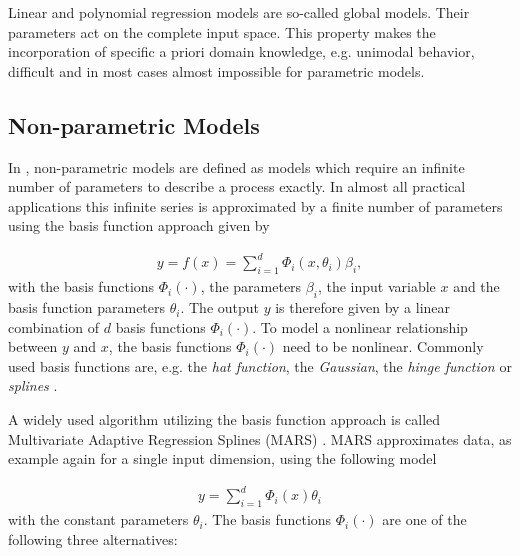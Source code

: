 Linear and polynomial regression models are so-called global models. Their parameters act on the complete input space. This property makes the incorporation of specific a priori domain knowledge, e.g. unimodal behavior, difficult and in most cases almost impossible for parametric models. 

\subsection{Non-parametric Models}

In \cite{nelles2013nonlinear}, non-parametric models are defined as models which require an infinite number of parameters to describe a process exactly. In almost all practical applications this infinite series is approximated by a finite number of parameters using the basis function approach given by

\begin{align} \label{eq:basis-function-approach}
	y = f(x) = \sum_{i=1}^d \Phi_i(x, \theta_i) \beta_i,
\end{align} 
%
with the basis functions $\Phi_i(\cdot)$, the parameters $\beta_i$, the input variable $x$ and the basis function parameters $\theta_i$. The output $y$ is therefore given by a linear combination of $d$ basis functions $\Phi_i(\cdot)$. To model a nonlinear relationship between $y$ and $x$, the basis functions $\Phi_i(\cdot)$ need to be nonlinear. Commonly used basis functions are, e.g. the \emph{hat function}, the \emph{Gaussian}, the \emph{hinge function} or \emph{splines} \cite{friedman2001elements}. 

A widely used algorithm utilizing the basis function approach is called Multivariate Adaptive Regression Splines (MARS) \cite{friedman1991multivariate}. MARS approximates data, as example again for a single input dimension, using the following model

\begin{align} \label{eq:MARS}
	y = \sum_{i=1}^d \Phi_i(x) \theta_i
\end{align}
%
with the constant parameters $\theta_i$. The basis functions $\Phi_i(\cdot)$ are one of the following three alternatives:

